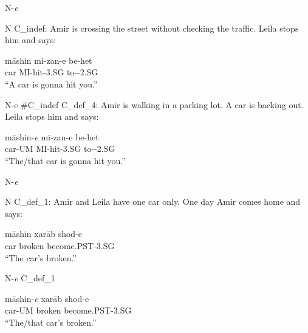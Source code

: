 \documentclass[10pt]{beamer}
\begin{document}
\begin {frame} {N-\emph{{\color {red}e}}}

\begin {exampleblock} {N}
{\small C_{indef}: Amir is crossing the street without checking the traffic. Leila stops him and says: }
	\begin {exe}
		\ex \label{} \gll	m\={a}shin	mi-zan-e be-het\\
			car	{\scriptsize MI-}hit{\scriptsize -3.SG} to-{\scriptsize -2.SG}\\
			``A car is gonna hit you.''\\
	\end {exe}

\end {exampleblock}

\pause

\begin {exampleblock} {N-{\color {red}e}}
{\small {\color {gray}\#C_{indef} }}
{\small C_{def_4}: Amir is walking in a parking lot. A car is backing out. Leila stops him and says: }
	\begin {exe}
		\ex \label{} \gll	m\={a}shin-\emph{{\color {red}e}}	mi-zan-e be-het\\
			car-{\scriptsize UM}	{\scriptsize MI-}hit{\scriptsize -3.SG} to-{\scriptsize -2.SG}\\
			``The/that car is gonna hit you.''\\
	\end {exe}

\end {exampleblock}

\end {frame}


\begin {frame} {N-\emph{{\color {red}e}}}

\begin {exampleblock} {N}
{\small C_{def_1}: Amir and Leila have one car only. One day Amir comes home and says:}
	\begin {exe}
		\ex \label{} \gll	m\={a}shin	xar\={a}b	shod-e\\
			car	broken	become{\scriptsize .PST-3.SG}\\
			``The car's broken.''\\
	\end {exe}
\end {exampleblock}
\pause
\begin {exampleblock} {N-\emph{{\color {red}e}}}
{\small C_{def_1}}
	\begin {exe}
		\ex \label{} \gll	m\={a}shin-\emph{{\color {red}e}}	xar\={a}b	shod-e\\
			car-{\scriptsize UM}	broken	become{\scriptsize .PST-3.SG}\\
			``The/that car's broken.''\\
	\end {exe}
\end {exampleblock}

\end {frame}
\end{document}
